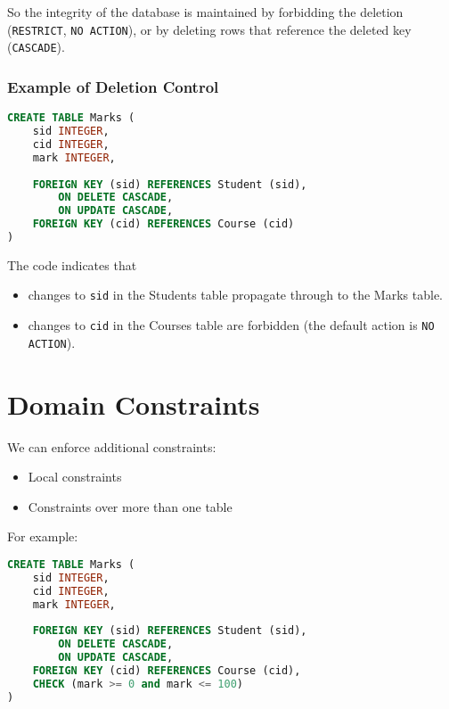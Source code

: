 So the integrity of the database is maintained by forbidding the deletion \\
(\verb|RESTRICT|, \verb|NO ACTION|), or by deleting rows that reference the deleted key (\verb|CASCADE|).

\subsubsection{Example of Deletion Control}
\begin{lstlisting}[language=SQL,tabsize=3]
CREATE TABLE Marks (
	sid INTEGER,
	cid INTEGER,
	mark INTEGER,
	
	FOREIGN KEY (sid) REFERENCES Student (sid),
		ON DELETE CASCADE,
		ON UPDATE CASCADE,
	FOREIGN KEY (cid) REFERENCES Course (cid)
)
\end{lstlisting}

The code indicates that 
\begin{itemize}
	\item changes to \verb|sid| in the Students table propagate through to the Marks table.
	\item changes to \verb|cid| in the Courses table are forbidden (the default action is \verb|NO ACTION|).
\end{itemize}

\section{Domain Constraints}
We can enforce additional constraints:
\begin{itemize}
	\item Local constraints
	\item Constraints over more than one table
\end{itemize}

For example:
\begin{lstlisting}[language=SQL,tabsize=3]
CREATE TABLE Marks (
	sid INTEGER,
	cid INTEGER,
	mark INTEGER,
	
	FOREIGN KEY (sid) REFERENCES Student (sid),
		ON DELETE CASCADE,
		ON UPDATE CASCADE,
	FOREIGN KEY (cid) REFERENCES Course (cid),
	CHECK (mark >= 0 and mark <= 100)
)
\end{lstlisting}


